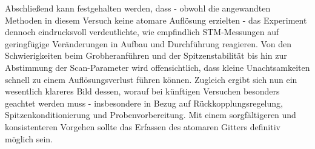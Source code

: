 Abschließend kann festgehalten werden, dass - obwohl die angewandten Methoden in diesem Versuch keine atomare Auflösung erzielten - das Experiment dennoch eindrucksvoll verdeutlichte, wie empfindlich STM-Messungen auf geringfügige Veränderungen in Aufbau und Durchführung reagieren. 
Von den Schwierigkeiten beim Grobheranführen und der Spitzenstabilität bis hin zur Abstimmung der Scan-Parameter wird offensichtlich, dass kleine Unachtsamkeiten schnell zu einem Auflösungsverlust führen können. 
Zugleich ergibt sich nun ein wesentlich klareres Bild dessen, worauf bei künftigen Versuchen besonders geachtet werden muss - insbesondere in Bezug auf Rückkopplungsregelung, Spitzenkonditionierung und Probenvorbereitung. 
Mit einem sorgfältigeren und konsistenteren Vorgehen sollte das Erfassen des atomaren Gitters definitiv möglich sein.

